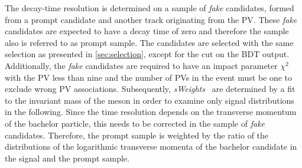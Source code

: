 The decay-time resolution is determined on a sample of \emph{fake} \Bz candidates, formed from a prompt \Dpm candidate and another track originating from the PV.
These \emph{fake} \Bz candidates are expected to have a decay time of zero and therefore the sample also is referred to as prompt sample.
The candidates are selected with the same selection as presented in \cref{sec:selection}, except for the cut on the BDT output.
Additionally, the \emph{fake} \Bz candidates are required to have an impact parameter $\chi^2$ with the PV less than nine and the number of \ac{PV}s in the event must be one to exclude wrong \ac{PV} associations.
Subsequently, \emph{sWeights}~\cite{Pivk:2004ty} are determined by a fit to the invariant mass of the \Dpm meson in order to examine only signal distributions in the following.
Since the time resolution depends on the transverse momentum of the bachelor particle, this needs to be corrected in the sample of \emph{fake} \Bz candidates.
Therefore, the prompt sample is weighted by the ratio of the distributions of the logarithmic transverse momenta of the bachelor candidate in the signal \BdToDpi and the prompt sample.

